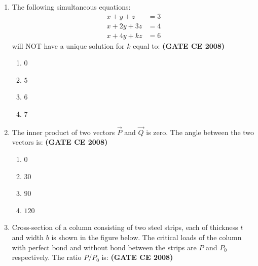 \documentclass[journal]{IEEEtran}
\begin{document}
\begin{enumerate}
\item The following simultaneous equations: 
\[
\begin{aligned}
x + y + z &= 3 \\
x + 2y + 3z &= 4 \\
x + 4y + kz &= 6
\end{aligned}
\]
will NOT have a unique solution for $k$ equal to: \textbf{(GATE CE 2008)}
\begin{multicols}{2}
\begin{enumerate}
\item $0$
\item $5$
\item $6$
\item $7$
\end{enumerate}
\end{multicols}

\item The inner  product of two vectors $\vec{P}$ and $\vec{Q}$ is zero. The angle  between the two vectors is: \textbf{(GATE CE 2008)}
\begin{multicols}{2}
\begin{enumerate}
\item $0$
\item $30$
\item $90$
\item $120$
\end{enumerate}
\end{multicols}

\item Cross-section of a column consisting of two steel strips, each of thickness $t$ and width $b$ is shown in the figure below. The critical loads of the column with perfect bond and without bond between the strips are $P$ and $P_0$ respectively. The ratio $P/P_0$ is: \textbf{(GATE CE 2008)}
\vspace{0.1cm}

\end{enumerate}
\end{document}
